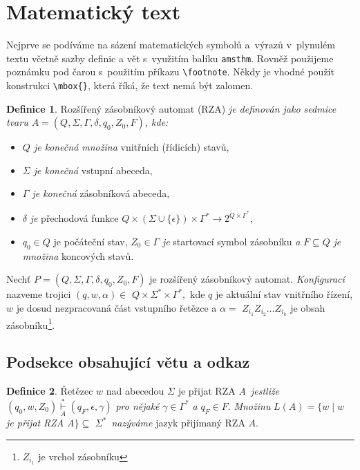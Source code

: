 \documentclass[twocolumn,11pt]{article}
\theoremstyle{definition}
\newtheorem{definiton}{Definice}
\begin{document}
\section{Matematický text}
Nejprve se podíváme na sázení matematických symbolů a~výrazů v~plynulém textu včetně sazby definic a vět s~využitím balíku \texttt{amsthm}. Rovněž použijeme poznámku pod čarou s~použitím příkazu \verb|\footnote|. Někdy je vhodné použít konstrukci \verb|\mbox{}|, která říká, že text nemá být zalomen.
\begin{definiton}
\label{def1}
Rozšířený zásobníkový automat (RZA) \emph{je definován jako sedmice tvaru $ A=\left(Q, \Sigma, \Gamma, \delta, q_{0}, Z_{0}, F\right)$, kde:}

\renewcommand\labelitemi{$\bullet$}
\begin{itemize}
    \item \emph{$Q$ je konečná množina} vnitřních (řídicích) stavů,
    \item \emph{$\Sigma$ je konečná} vstupní abeceda,
    \item \emph{$\Gamma$ je konečná} zásobníková abeceda,
    \item $\delta$ \emph{je} přechodová funkce $Q \times(\Sigma \cup\{\epsilon\}) \times \Gamma^{*} \rightarrow 2^{Q \times \Gamma^{*}}$,
    \item $q_{0} \in Q$ je počáteční stav, $Z_{0} \in \Gamma$ \emph{je} startovací symbol zásobníku \emph{a} $F \subseteq Q$ \emph{je množina} koncových stavů.
\end{itemize}
\end{definiton}

Nechť $P=\left(Q, \Sigma, \Gamma, \delta, q_{0}, Z_{0}, F\right)$ je rozšířený zásobníkový automat. \emph{Konfigurací} nazveme trojici $(q, w, \alpha) \in$ $Q \times \Sigma^{*} \times \Gamma^{*},$ kde $q$ je aktuální stav vnitřního řízení, $w$ je dosud nezpracovaná část vstupního řetězce a $\alpha=$ $Z_{i_{1}} Z_{i_{2}} \ldots Z_{i_{k}}$ je obsah zásobníku\footnote{$Z_{i_{1}}$ je vrchol zásobníku}.

\subsection{Podsekce obsahující větu a odkaz}

\begin{definiton} 
\label{def2}
Řetězec $w$ nad abecedou $\Sigma$ je přijat RZA \emph{A~jestliže} $\left(q_{0}, w, Z_{0}\right) \overset{*}{\underset{A}{\vdash}} \left(q_{F}, \epsilon, \gamma\right)$ 
\emph{pro nějaké} $\gamma \in \Gamma^{*}$ \emph{a}
$q_{F} \in F .$ \emph{Množinu} $L(A)=\{w \mid w$ \emph{je přijat}\emph{ RZA A}$\} \subseteq$
$\Sigma^{*}$~\emph{nazýváme} jazyk přijímaný RZA $A$.
\end{definiton}
\end{document}
